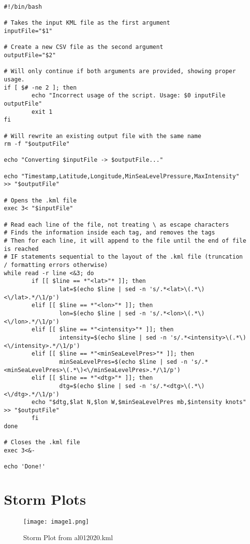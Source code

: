 \documentclass[]{article}
\begin{document}
\begin{verbatim}
#!/bin/bash

# Takes the input KML file as the first argument
inputFile="$1"

# Create a new CSV file as the second argument
outputFile="$2"

# Will only continue if both arguments are provided, showing proper usage.
if [ $# -ne 2 ]; then
        echo "Incorrect usage of the script. Usage: $0 inputFile outputFile"
        exit 1
fi

# Will rewrite an existing output file with the same name
rm -f "$outputFile"

echo "Converting $inputFile -> $outputFile..."

echo "Timestamp,Latitude,Longitude,MinSeaLevelPressure,MaxIntensity" >> "$outputFile"

# Opens the .kml file
exec 3< "$inputFile"

# Read each line of the file, not treating \ as escape characters
# Finds the information inside each tag, and removes the tags
# Then for each line, it will append to the file until the end of file is reached
# IF statements sequential to the layout of the .kml file (truncation / formatting errors otherwise)
while read -r line <&3; do
        if [[ $line == *"<lat>"* ]]; then
                lat=$(echo $line | sed -n 's/.*<lat>\(.*\)<\/lat>.*/\1/p')
        elif [[ $line == *"<lon>"* ]]; then
                lon=$(echo $line | sed -n 's/.*<lon>\(.*\)<\/lon>.*/\1/p')
        elif [[ $line == *"<intensity>"* ]]; then
                intensity=$(echo $line | sed -n 's/.*<intensity>\(.*\)<\/intensity>.*/\1/p')
        elif [[ $line == *"<minSeaLevelPres>"* ]]; then
                minSeaLevelPres=$(echo $line | sed -n 's/.*<minSeaLevelPres>\(.*\)<\/minSeaLevelPres>.*/\1/p')
        elif [[ $line == *"<dtg>"* ]]; then
                dtg=$(echo $line | sed -n 's/.*<dtg>\(.*\)<\/dtg>.*/\1/p')
        echo "$dtg,$lat N,$lon W,$minSeaLevelPres mb,$intensity knots" >> "$outputFile"
        fi
done

# Closes the .kml file
exec 3<&-

echo 'Done!'

\end{verbatim}

\section{Storm Plots}

\begin{figure}[!h]
  \centering
  \texttt{[image: image1.png]}
  \caption{Storm Plot from al012020.kml}
  \label{fig:myimage}
\end{figure}
\end{document}
